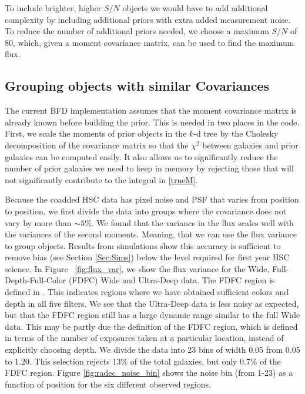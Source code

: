 \documentclass[useAMS,usenatbib]{mnras}
\begin{document}
To include brighter, higher $S/N$ objects we would have to add additional complexity by including additional priors with extra added measurement noise.  To reduce the number of additional priors needed, we choose a maximum $S/N$ of 80, which, given a moment covariance matrix, can be used to find the maximum flux.




\subsection{Grouping objects with similar Covariances}
The current BFD implementation assumes that the moment covariance matrix is already known before building the prior.  This is needed in two places in the code.  First, we scale the moments of prior objects in the $k$-d tree by the Cholesky decomposition of the covariance matrix so that the $\chi^2$ between galaxies and prior galaxies can be computed easily. It also allows us to significantly reduce the number of prior galaxies we need to keep in memory by rejecting those that will not significantly contribute to the integral in \ref{trueM}.

Because the coadded HSC data has pixel noise and PSF that varies from position to position, we first divide the data into groups where the covariance does not vary by more than $\sim5\%$.    We found that the variance in the flux scales well with the variances of the second moments.  Meaning, that we can use the flux variance to group objects.  Results from simulations show this accuracy is sufficient to remove bias (see Section \ref{Sec:Sims}) below the level required for first year HSC science. In Figure ~\ref{fig:flux_var}, we show the flux variance for the Wide, Full-Depth-Full-Color (FDFC) Wide and Ultra-Deep data.  The FDFC region is defined in \cite{ShearPaper:inprep}.  This indicates regions where we have obtained sufficient colors and depth in all five filters.   We see that the Ultra-Deep data is less noisy as expected, but that the FDFC region still has a large dynamic range similar to the full Wide data.  This may be partly due the definition of the FDFC region, which is defined in terms of the number of exposures taken at a particular location, instead of explicitly choosing depth.  We divide the data into 23 bins of width 0.05 from 0.05 to 1.20.  This selection rejects 13$\%$ of the total galaxies, but only 0.7$\%$ of the FDFC region. Figure \ref{fig:radec_noise_bin} shows the noise bin (from 1-23) as a function of position for the six different observed regions.
\end{document}
